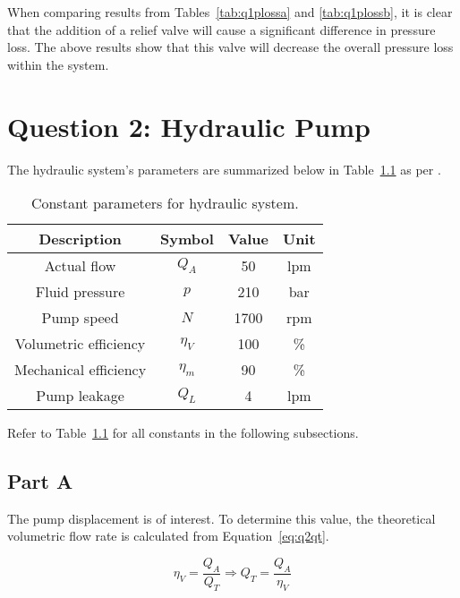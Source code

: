 When comparing results from Tables~\ref{tab:q1plossa} and \ref{tab:q1plossb}, it is clear that the addition of a relief valve will cause a significant difference in pressure loss. The above results show that this valve will decrease the overall pressure loss within the system.
\chapter{Question 2: Hydraulic Pump}
\label{chap:q2}

The hydraulic system's parameters are summarized below in Table~\ref{tab:q2param} as per \cite{assign}.

\begin{table}[H]
  \centering
  \caption{Constant parameters for hydraulic system.}
    \begin{tabular}{cccc}
    \toprule
    \textbf{Description} & \textbf{Symbol} & \textbf{Value } & \textbf{Unit} \\
    \midrule
    Actual flow & $Q_A$     & 50    & lpm \\
    Fluid pressure & $p$     & 210   & bar \\
    Pump speed & $N$     & 1700  & rpm \\
	Volumetric efficiency & $\eta_V$     & 100  & \% \\
	Mechanical efficiency & $\eta_m$     & 90  & \% \\
	Pump leakage & $Q_L$     & 4  & lpm \\
    \bottomrule
    \end{tabular}
  \label{tab:q2param}
\end{table}

Refer to Table~\ref{tab:q2param} for all constants in the following subsections.

\section{Part A}
\label{sect:2a}

The pump displacement is of interest. To determine this value, the theoretical volumetric flow rate is calculated from Equation~\ref{eq:q2qt}. 

\begin{equation}
	\label{eq:q2qt}
	\eta_V = \frac{Q_A}{Q_T} \Rightarrow Q_T = \frac{Q_A}{\eta_V}
\end{equation}

